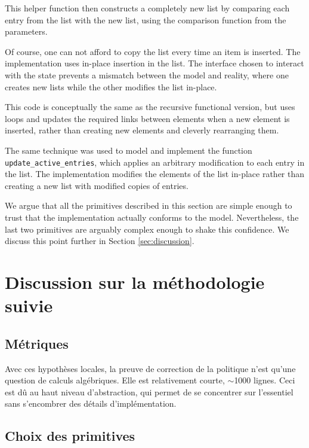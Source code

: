 	This helper function then constructs a completely new list by comparing each entry from the list with the new list, using the comparison function from the parameters. 

	Of course, one can not afford to copy the list every time an item is inserted. The implementation uses in-place insertion in the list. The interface chosen to interact with the state prevents a mismatch between the model and reality, where one creates new lists while the other modifies the list in-place.

	This code is conceptually the same as the recursive functional version, but uses loops and updates the required links between elements when a new element is inserted, rather than creating new elements and cleverly rearranging them.

	The same technique was used to model and implement the function \texttt{update\_active\_entries}, which applies an arbitrary modification to each entry in the list. The implementation modifies the elements of the list in-place rather than creating a new list with modified copies of entries.

	\label{sec:implementation}

	We argue that all the primitives described in this section are simple enough to trust that the implementation actually conforms to the model. Nevertheless, the last two primitives are arguably complex enough to shake this confidence. We discuss this point further in Section \ref{sec:discussion}.

	\section{Discussion sur la méthodologie suivie}
		\subsection{Métriques}
		Avec ces hypothèses locales, la preuve de correction de la politique n'est qu'une question de calculs algébriques. Elle est relativement courte, $\sim$1000 lignes. Ceci est dû au haut niveau d'abstraction, qui permet de se concentrer sur l'essentiel sans s'encombrer des détails d'implémentation.

		\subsection{Choix des primitives}
